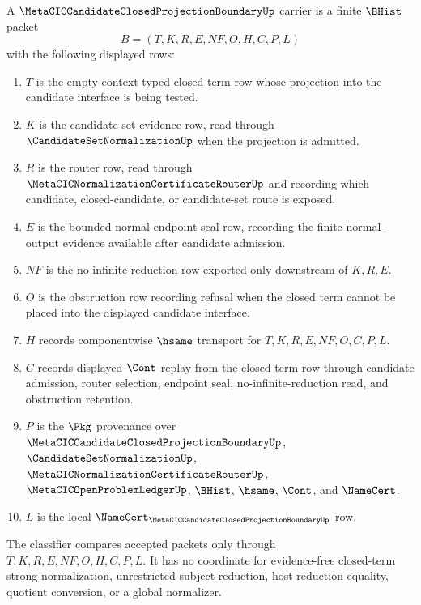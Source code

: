 \begin{definition}
\label{def:metacic-candidate-closed-projection-boundary-carrier}
A $\MetaCICCandidateClosedProjectionBoundaryUp$ carrier is a finite $\BHist$ packet
$$
B=(T,K,R,E,NF,O,H,C,P,L)
$$
with the following displayed rows:
\begin{enumerate}
\item $T$ is the empty-context typed closed-term row whose projection into the candidate interface is being tested.
\item $K$ is the candidate-set evidence row, read through $\CandidateSetNormalizationUp$ when the projection is admitted.
\item $R$ is the router row, read through $\MetaCICNormalizationCertificateRouterUp$ and recording which candidate, closed-candidate, or candidate-set route is exposed.
\item $E$ is the bounded-normal endpoint seal row, recording the finite normal-output evidence available after candidate admission.
\item $NF$ is the no-infinite-reduction row exported only downstream of $K,R,E$.
\item $O$ is the obstruction row recording refusal when the closed term cannot be placed into the displayed candidate interface.
\item $H$ records componentwise $\hsame$ transport for $T,K,R,E,NF,O,C,P,L$.
\item $C$ records displayed $\Cont$ replay from the closed-term row through candidate admission, router selection, endpoint seal, no-infinite-reduction read, and obstruction retention.
\item $P$ is the $\Pkg$ provenance over $\MetaCICCandidateClosedProjectionBoundaryUp$, $\CandidateSetNormalizationUp$, $\MetaCICNormalizationCertificateRouterUp$, $\MetaCICOpenProblemLedgerUp$, $\BHist$, $\hsame$, $\Cont$, and $\NameCert$.
\item $L$ is the local $\NameCert_{\MetaCICCandidateClosedProjectionBoundaryUp}$ row.
\end{enumerate}
The classifier compares accepted packets only through $T,K,R,E,NF,O,H,C,P,L$. It has no coordinate for evidence-free closed-term strong normalization, unrestricted subject reduction, host reduction equality, quotient conversion, or a global normalizer.
\end{definition}

